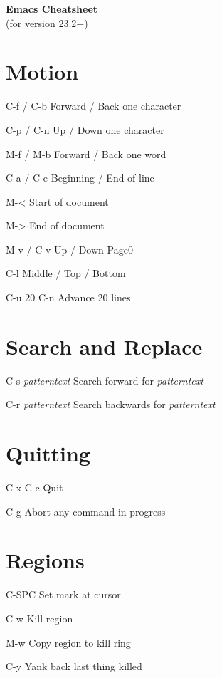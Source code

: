 \documentclass[11pt,landscape,a4paper]{article}
\begin{document}
\begin{multicols}{3}

\begin{center}
  {
    \huge \bfseries Emacs Cheatsheet
  }\\
  {
    (\large for version 23.2+)
  }
\end{center}

\section{Motion}
\begin{eqlist}
\item[C-f / C-b] Forward / Back one character
\item[C-p / C-n] Up / Down one character
\item[M-f / M-b] Forward / Back one word
\item[C-a / C-e] Beginning / End of line
\item[M-\textless] Start of document
\item[M-\textgreater] End of document
\item[M-v / C-v] Up / Down Page0
\item[C-l] Middle / Top / Bottom
\item[C-u 20 C-n] Advance 20 lines
\end{eqlist}

\section{Search and Replace}
\begin{eqlist}
\item[C-s \textit{patterntext}] Search forward for
  \textit{patterntext}
\item[C-r \textit{patterntext}] Search backwards for
  \textit{patterntext}
\end{eqlist}

\section{Quitting}
\begin{eqlist}
\item[C-x C-c] Quit
\item[C-g] Abort any command in progress
\end{eqlist}

\section{Regions}
\begin{eqlist}
\item[C-SPC] Set mark at cursor
\item[C-w] Kill region
\item[M-w] Copy region to kill ring
\item[C-y] Yank back last thing killed
\end{eqlist}


\end{multicols}
\end{document}
